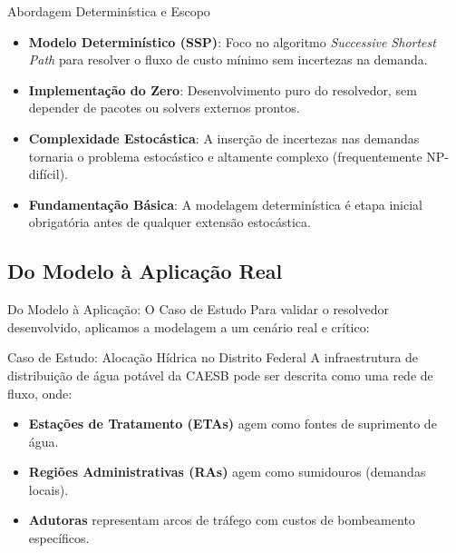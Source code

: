 \begin{frame}{Abordagem Determinística e Escopo}
  \small
  \begin{itemize}
    \setlength{\itemsep}{8pt}
    \item \textbf{Modelo Determinístico (SSP)}: Foco no algoritmo \textit{Successive Shortest Path} para resolver o fluxo de custo mínimo sem incertezas na demanda.
    \item \textbf{Implementação do Zero}: Desenvolvimento puro do resolvedor, sem depender de pacotes ou solvers externos prontos.
    \item \textbf{Complexidade Estocástica}: A inserção de incertezas nas demandas tornaria o problema estocástico e altamente complexo (frequentemente NP-difícil).
    \item \textbf{Fundamentação Básica}: A modelagem determinística é etapa inicial obrigatória antes de qualquer extensão estocástica.
  \end{itemize}
\end{frame}

\subsection{Do Modelo à Aplicação Real}
\begin{frame}{Do Modelo à Aplicação: O Caso de Estudo}
  Para validar o resolvedor desenvolvido, aplicamos a modelagem a um cenário real e crítico:
  
  \begin{block}{Caso de Estudo: Alocação Hídrica no Distrito Federal}
    A infraestrutura de distribuição de água potável da CAESB pode ser descrita como uma rede de fluxo, onde:
    \begin{itemize}
      \item \textbf{Estações de Tratamento (ETAs)} agem como fontes de suprimento de água.
      \item \textbf{Regiões Administrativas (RAs)} agem como sumidouros (demandas locais).
      \item \textbf{Adutoras} representam arcos de tráfego com custos de bombeamento específicos.
    \end{itemize}
  \end{block}
\end{frame}


